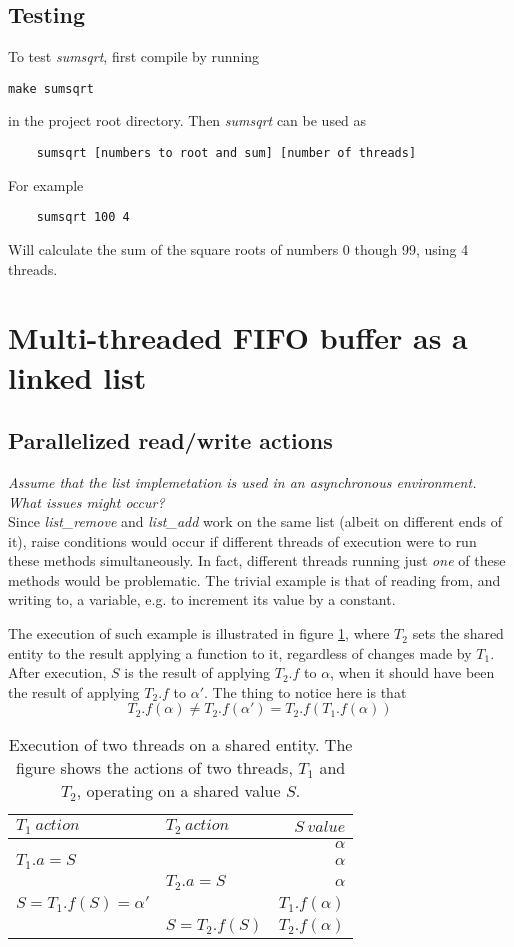 \documentclass[a4paper, titlepage]{article}
\begin{document}
\subsection{Testing}
To test \emph{sumsqrt}, first compile by running
\begin{verbatim}
make sumsqrt
\end{verbatim}
in the project root
directory. Then \emph{sumsqrt} can be used as
\begin{verbatim}
	sumsqrt [numbers to root and sum] [number of threads]
\end{verbatim}
For example
\begin{verbatim}
	sumsqrt 100 4
\end{verbatim}
Will calculate the sum of the square roots of numbers 0 though 99, using 4
threads.

\section{Multi-threaded FIFO buffer as a linked list}
\subsection{Parallelized read/write actions}
\textit{Assume that the list implemetation is used in an asynchronous
environment. What issues might occur?}\\

Since \emph{list\_remove} and \emph{list\_add} work on the same list (albeit on
different ends of it), raise conditions would occur if different threads of
execution were to run these methods simultaneously. In fact, different threads
running just \textit{one} of these methods would be problematic. The trivial
example is that of reading from, and writing to, a variable, e.g. to increment
its value by a constant.

The execution of such example is illustrated in figure
\ref{tab:threadaccess}, where $T_2$ sets the shared entity to the result
applying a function to it, regardless of changes made by $T_1$. After
execution, $S$ is the result of applying $T_2.f$ to $\alpha$, when it should
have been the result of applying $T_2.f$ to $\alpha'$. The thing to notice here
is that $$T_2.f(\alpha) \neq T_2.f(\alpha') = T_2.f(T_1.f(\alpha))$$

\begin{table}[hbtp]
	\centering
	\begin{tabular}{|l|l|r|}
		\hline
		$T_1\ action$&$T_2\ action$&$S\ value$\\
		\hline
		&&$\alpha$\\
		\hline
		$T_1.a = S$&&$\alpha$\\
		\hline
		&$T_2.a = S$&$\alpha$\\
		\hline
		$S = T_1.f(S) = \alpha'$&&$T_1.f(\alpha)$\\
		\hline
		&$S = T_2.f(S)$&$T_2.f(\alpha)$\\
		\hline
	\end{tabular}
	\caption{
		Execution of two threads on a shared entity. The figure shows
		the actions of two threads, $T_1$ and $T_2$, operating on a
		shared value $S$.
		\label{tab:threadaccess}
	}
\end{table}
\end{document}
